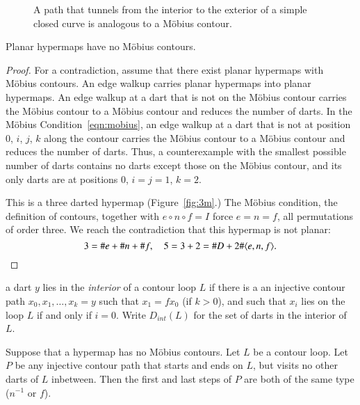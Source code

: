 \begin{figure}[htb]
  \centering
  \caption{A path that tunnels from the interior to the exterior
   of a simple closed curve
   is analogous to a M\"obius contour.}
  \label{fig:violate-jct}
\end{figure}






\begin{lemma}
Planar hypermaps have no M\"obius contours.
\end{lemma}

\begin{proof} For a contradiction, assume that there exist planar
hypermaps with M\"obius contours.  An edge walkup carries
planar hypermaps into planar hypermaps. An edge walkup
at a dart that is not on the M\"obius contour carries the
M\"obius contour to a M\"obius contour 
and reduces the number of darts.  
In the M\"obius Condition~\ref{eqn:mobius},
an edge walkup at a dart that is not at position $0$, $i$, $j$, $k$
along the contour carries the M\"obius contour to a M\"obius contour
and reduces the number of darts. Thus, a counterexample with
the smallest possible number of darts contains no
darts except those on the M\"obius contour, and its only darts
are at positions $0$, $i=j=1$, $k=2$.

This is a three darted hypermap (Figure~\ref{fig:3m}.)  
The M\"obius condition, the
definition of contours, together with $e\circ n\circ f=I$ force
$e=n=f$, all permutations of order three. We reach the contradiction
that this hypermap is not planar:
    $$3 = \# e + \# n + \# f,\quad 5 = 3+2 = \# D + 2 \#\langle e,n,f\rangle.$$
\end{proof}





\begin{definition}[interior]\label{def:interior} 
a dart $y$ lies in the {\it interior} of a contour
loop $L$ if there is a an injective contour path
$x_0,x_1,\ldots,x_k=y$ such that $x_1 = f x_0$ (if $k>0$), and
such that $x_i$ lies on the loop $L$ if and only if $i=0$.
Write $D_{int}(L)$ for the set of darts in the interior of $L$.
\end{definition}

\begin{lemma}
Suppose that a hypermap has no M\"obius contours.
Let $L$ be a contour loop.  Let $P$ be any injective contour path
that starts and ends on $L$, but visits no other darts of $L$ inbetween.  
Then the first and last steps of $P$ are both of the same
type ($n^{-1}$ or $f$).
\end{lemma}

